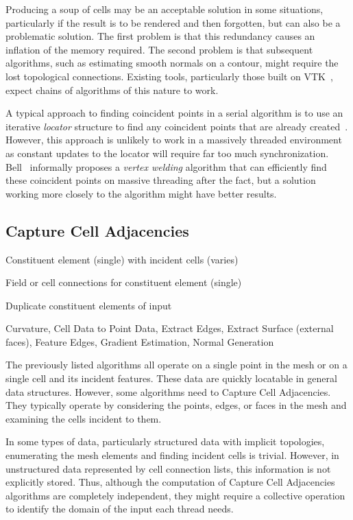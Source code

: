 \documentclass{sig-alternate}
\newcommand*{\lcite}[1]{~\cite{#1}}
\newcommand*{\scite}[1]{~\cite{#1}}
\newcommand*{\keyterm}[1]{\emph{#1}}
\newcommand{\algclass}[1]{\textsf{#1}}
\newcommand{\algorithmclasssection}[1]{\subsection*{#1}}
\newcommand{\algorithmclass}[5]{
  \algorithmclasssection{#1} %
  \begin{description}[leftmargin=9em,style=nextline,noitemsep]
    \raggedright
  \item[Input] #2
  \item[Output] #3
  \item[Interdependence] #4
  \item[Algorithms] #5
  \end{description}
}
\begin{document}
Producing a soup of cells may be an acceptable solution in some situations,
particularly if the result is to be rendered and then forgotten, but can
also be a problematic solution. The first problem is that this redundancy
causes an inflation of the memory required. The second problem is that
subsequent algorithms, such as estimating smooth normals on a contour,
might require the lost topological connections. Existing tools,
particularly those built on VTK\lcite{VTK}, expect chains of algorithms of
this nature to work.

A typical approach to finding coincident points in a serial algorithm is to
use an iterative \keyterm{locator} structure to find any coincident points
that are already created\lcite{VTKUsersGuide}. However, this approach is
unlikely to work in a massively threaded environment as constant updates to
the locator will require far too much synchronization. Bell\scite{Bell2010}
informally proposes a \keyterm{vertex welding} algorithm that can
efficiently find these coincident points on massive threading after the
fact, but a solution working more closely to the algorithm might have
better results.


\algorithmclass{Capture Cell Adjacencies}
               {Constituent element (single) with incident cells (varies)} %
               {Field or cell connections for constituent element (single)} %
               {Duplicate constituent elements of input} %
               {Curvature, Cell Data to Point Data, Extract Edges, Extract
                 Surface (external faces), Feature Edges, Gradient
                 Estimation, Normal Generation}

\noindent
The previously listed algorithms all operate on a single point in the mesh
or on a single cell and its incident features. These data are quickly
locatable in general data structures. However, some algorithms need to
\algclass{Capture Cell Adjacencies}. They typically operate by considering
the points, edges, or faces in the mesh and examining the cells incident to
them.

In some types of data, particularly structured data with implicit
topologies, enumerating the mesh elements and finding incident cells is
trivial. However, in unstructured data represented by cell connection
lists, this information is not explicitly stored. Thus, although the
computation of \algclass{Capture Cell Adjacencies} algorithms are
completely independent, they might require a collective operation to
identify the domain of the input each thread needs.
\end{document}
